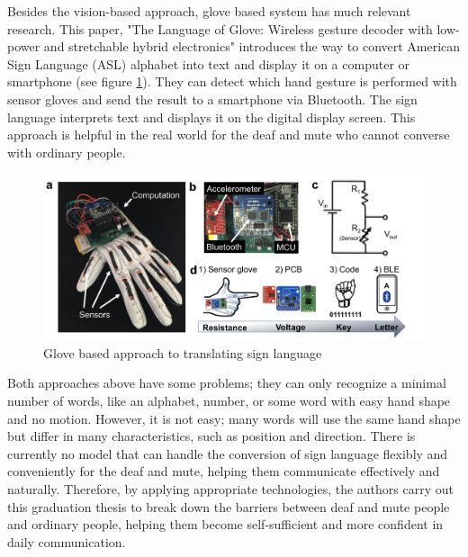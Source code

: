 Besides the vision-based approach, glove based system has much relevant research. This paper, "The Language of Glove: Wireless gesture decoder with low-power and stretchable hybrid electronics" \cite{o2017language} introduces the way to convert American Sign Language (ASL) alphabet into text and display it on a computer or smartphone (see figure \ref{fig:Chap2-Glove-Base}). They can detect which hand gesture is performed with sensor gloves and send the result to a smartphone via Bluetooth. The sign language interprets text and displays it on the digital display screen. This approach is helpful in the real world for the deaf and mute who cannot converse with ordinary people.

\begin{figure}[H]
  \centering
  \includegraphics[width=\textwidth]{img/Chap2/Glove-Based.png}
  \caption{Glove based approach to translating sign language}
  \label{fig:Chap2-Glove-Base}
\end{figure}

Both approaches above have some problems; they can only recognize a minimal number of words, like an alphabet, number, or some word with easy hand shape and no motion. However, it is not easy; many words will use the same hand shape but differ in many characteristics, such as position and direction. There is currently no model that can handle the conversion of sign language flexibly and conveniently for the deaf and mute, helping them communicate effectively and naturally. Therefore, by applying appropriate technologies, the authors carry out this graduation thesis to break down the barriers between deaf and mute people and ordinary people, helping them become self-sufficient and more confident in daily communication.

